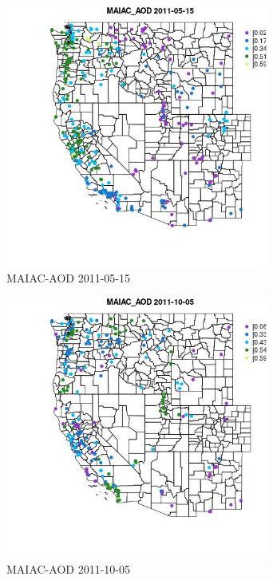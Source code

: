 \begin{figure} 
\centering  
\includegraphics[width=0.77\textwidth]{Code_Outputs/ML_input_report_ML_input_PM25_Step5_part_d_de_duplicated_aves_ML_input_MapObsMAIAC_AOD2011-05-15.jpg} 
\caption{\label{fig:ML_input_report_ML_input_PM25_Step5_part_d_de_duplicated_aves_ML_inputMapObsMAIAC_AOD2011-05-15}MAIAC-AOD 2011-05-15} 
\end{figure} 
 

\clearpage 

\begin{figure} 
\centering  
\includegraphics[width=0.77\textwidth]{Code_Outputs/ML_input_report_ML_input_PM25_Step5_part_d_de_duplicated_aves_ML_input_MapObsMAIAC_AOD2011-10-05.jpg} 
\caption{\label{fig:ML_input_report_ML_input_PM25_Step5_part_d_de_duplicated_aves_ML_inputMapObsMAIAC_AOD2011-10-05}MAIAC-AOD 2011-10-05} 
\end{figure} 
 

